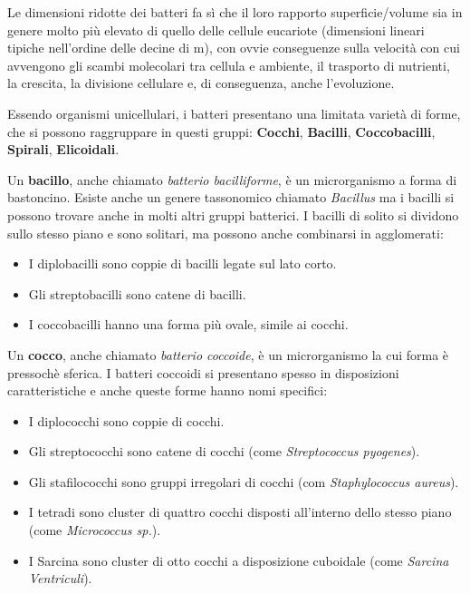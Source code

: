 \documentclass[../main.tex]{subfiles}
\begin{document}
Le dimensioni ridotte dei batteri fa sì che il loro rapporto superficie/volume sia in genere molto più elevato di quello delle cellule eucariote (dimensioni lineari tipiche nell’ordine delle decine di \micro m), con ovvie conseguenze sulla velocità con cui avvengono gli scambi molecolari tra cellula e ambiente, il trasporto di nutrienti, la crescita, la divisione cellulare e, di conseguenza, anche l’evoluzione. \cite{deho_galli_2020}

Essendo organismi unicellulari, i batteri presentano una limitata varietà di forme, che si possono raggruppare in questi gruppi: \textbf{Cocchi}, \textbf{Bacilli}, \textbf{Coccobacilli}, \textbf{Spirali}, \textbf{Elicoidali}.

Un \textbf{bacillo}, anche chiamato \textit{batterio bacilliforme}, è un microrganismo a forma di bastoncino. Esiste anche un genere tassonomico chiamato \textit{Bacillus} ma i bacilli si possono trovare anche in molti altri gruppi batterici. I bacilli di solito si dividono sullo stesso piano e sono solitari, ma possono anche combinarsi in agglomerati:

\begin{itemize}
	\itemsep0em 
	\item I diplobacilli sono coppie di bacilli legate sul lato corto.
	\item Gli streptobacilli sono catene di bacilli.
	\item I coccobacilli hanno una forma più ovale, simile ai cocchi.
\end{itemize}

Un \textbf{cocco}, anche chiamato \textit{batterio coccoide}, è un microrganismo la cui forma è pressochè sferica. I batteri coccoidi si presentano spesso in disposizioni caratteristiche e anche queste forme hanno nomi specifici: \cite{zapun_2008}

\begin{itemize}
	\itemsep0em 
	\item I diplococchi sono coppie di cocchi.
	\item Gli streptococchi sono catene di cocchi (come \textit{Streptococcus pyogenes}).
	\item Gli stafilococchi sono gruppi irregolari di cocchi (com \textit{Staphylococcus aureus}).
	\item I tetradi sono cluster di quattro cocchi disposti all'interno dello stesso piano (come \textit{Micrococcus sp.}).
	\item I Sarcina sono cluster di otto cocchi a disposizione cuboidale (come \textit{Sarcina Ventriculi}).
\end{itemize}
\end{document}
